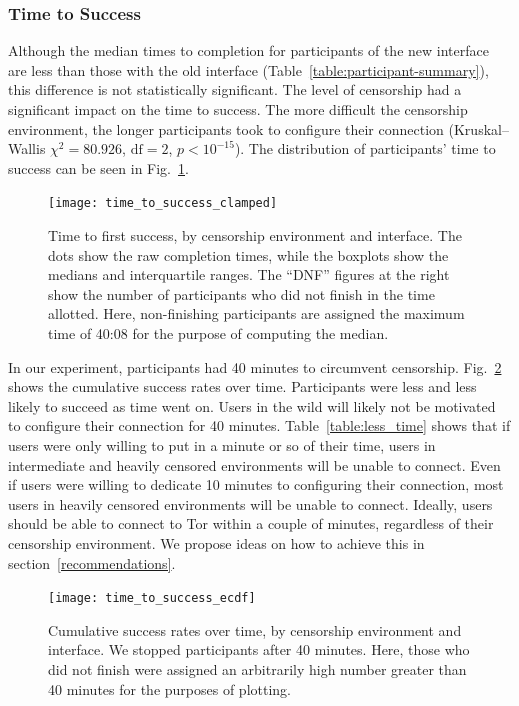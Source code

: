 \documentclass[USenglish,oneside,twocolumn]{article}
\begin{document}
\subsubsection{Time to Success} 
Although the median times to completion for participants of the new interface are less than those with the old interface (Table~\ref{table:participant-summary}), this difference is not statistically significant. The level of censorship had a significant impact on the time to success. The more difficult the censorship environment, the longer participants took to configure their connection (Kruskal--Wallis $\chi^2 = 80.926$, $\mbox{df} = 2$, $p < 10^{-15}$). The distribution of participants' time to success can be seen in Fig.~\ref{fig:time_to_success_clamped}.

\begin{figure}
\centering
\texttt{[image: time\_to\_success\_clamped]}
\caption{
Time to first success, by censorship environment and interface.
The dots show the raw completion times,
while the boxplots show the medians and interquartile ranges.
The ``DNF'' figures at the right show the number of participants 
who did not finish in the time allotted.
Here, non-finishing participants are assigned the maximum time of 40:08
for the purpose of computing the median.
}
\label{fig:time_to_success_clamped}
\end{figure}

In our experiment, participants had 40 minutes to circumvent censorship. Fig.~\ref{fig:time_to_success_ecdf} shows the cumulative success rates over time. Participants were less and less likely to succeed as time went on. Users in the wild will likely not be motivated to configure their connection for 40 minutes. Table~\ref{table:less_time} shows that if users were only willing to put in a minute or so of their time, users in intermediate and heavily censored environments will be unable to connect. Even if users were willing to dedicate 10 minutes to configuring their connection, most users in heavily censored environments will be unable to connect. Ideally, users should be able to connect to Tor within a couple of minutes, regardless of their censorship environment. We propose ideas on how to achieve this in section~\ref{recommendations}. 

\begin{figure}
\centering
\texttt{[image: time\_to\_success\_ecdf]}
\caption{
Cumulative success rates over time, by censorship environment and interface.
We stopped participants after 40 minutes. Here, those who did not finish were assigned
an arbitrarily high number greater than 40 minutes for the purposes of plotting. 
}
\label{fig:time_to_success_ecdf}
\end{figure}
\end{document}
